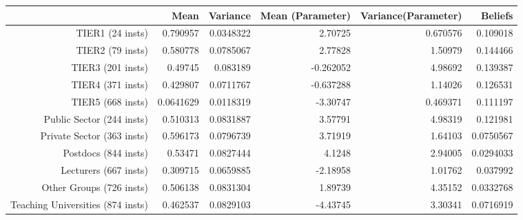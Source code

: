 \begin{tabular}{rrrrrr}
  \hline
   & \textbf{Mean} & \textbf{Variance} & \textbf{Mean (Parameter)} & \textbf{Variance(Parameter)} & \textbf{Beliefs} \\\hline
  TIER1 (24 insts) & 0.790957 & 0.0348322 & 2.70725 & 0.670576 & 0.109018 \\
  TIER2 (79 insts) & 0.580778 & 0.0785067 & 2.77828 & 1.50979 & 0.144466 \\
  TIER3 (201 insts) & 0.49745 & 0.083189 & -0.262052 & 4.98692 & 0.139387 \\
  TIER4 (371 insts) & 0.429807 & 0.0711767 & -0.637288 & 1.14026 & 0.126531 \\
  TIER5 (668 insts) & 0.0641629 & 0.0118319 & -3.30747 & 0.469371 & 0.111197 \\
  Public Sector (244 insts) & 0.510313 & 0.0831887 & 3.57791 & 4.98319 & 0.121981 \\
  Private Sector (363 insts) & 0.596173 & 0.0796739 & 3.71919 & 1.64103 & 0.0750567 \\
  Postdocs (844 insts) & 0.53471 & 0.0827444 & 4.1248 & 2.94005 & 0.0294033 \\
  Lecturers (667 insts) & 0.309715 & 0.0659885 & -2.18958 & 1.01762 & 0.037992 \\
  Other Groups (726 insts) & 0.506138 & 0.0831304 & 1.89739 & 4.35152 & 0.0332768 \\
  Teaching Universities (874 insts) & 0.462537 & 0.0829103 & -4.43745 & 3.30341 & 0.0716919 \\\hline
\end{tabular}
